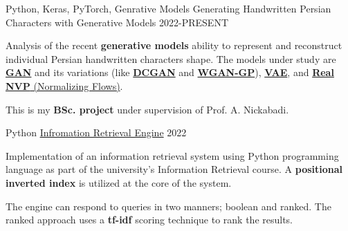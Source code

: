 

\begin{cventries}

  \cventry
    {Python, Keras, PyTorch, Genrative Models} %
    {Generating Handwritten Persian Characters with Generative Models} %
    {} %
    {2022-PRESENT} %
    {
      \begin{cvitems} %
      	\item {Analysis of the recent \textbf{generative models} ability to represent and reconstruct individual Persian handwritten characters shape. The models under study are \href{https://arxiv.org/abs/1406.2661}{\textbf{GAN}} and its variations (like \href{https://arxiv.org/abs/1511.06434}{\textbf{DCGAN}} and \href{https://arxiv.org/abs/1704.00028}{\textbf{WGAN-GP}}), \href{https://arxiv.org/abs/1312.6114}{\textbf{VAE}}, and \href{https://arxiv.org/abs/1605.08803}{\textbf{Real NVP} (Normalizing Flows)}.}
      	\item {This is my \textbf{BSc. project} under supervision of Prof. A. Nickabadi.}
      \end{cvitems}
    }

  \cventry
    {Python} %
    {\href{https://github.com/radinshayanfar/AUT-IR}{Infromation Retrieval Engine}} %
    {} %
    {2022} %
    {
      \begin{cvitems} %
      	\item {Implementation of an information retrieval system using Python programming language as part of the university's Information Retrieval course. A \textbf{positional inverted index} is utilized at the core of the system.}
      	\item {The engine can respond to queries in two manners; boolean and ranked. The ranked approach uses a \textbf{tf-idf} scoring technique to rank the results.}
      \end{cvitems}
    }
    

\end{cventries}
